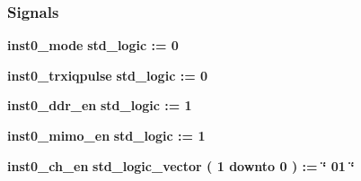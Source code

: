 \subsubsection*{Signals}
 \begin{DoxyCompactItemize}
\item 
{\bf inst0\+\_\+mode} {\bfseries \textcolor{comment}{std\+\_\+logic}\textcolor{vhdlchar}{ }\textcolor{vhdlchar}{ }\textcolor{vhdlchar}{\+:}\textcolor{vhdlchar}{=}\textcolor{vhdlchar}{ }\textcolor{vhdlchar}{ }\textcolor{vhdlchar}{\textquotesingle{}}\textcolor{vhdlchar}{ } \textcolor{vhdldigit}{0} \textcolor{vhdlchar}{ }\textcolor{vhdlchar}{\textquotesingle{}}\textcolor{vhdlchar}{ }} 
\item 
{\bf inst0\+\_\+trxiqpulse} {\bfseries \textcolor{comment}{std\+\_\+logic}\textcolor{vhdlchar}{ }\textcolor{vhdlchar}{ }\textcolor{vhdlchar}{\+:}\textcolor{vhdlchar}{=}\textcolor{vhdlchar}{ }\textcolor{vhdlchar}{ }\textcolor{vhdlchar}{\textquotesingle{}}\textcolor{vhdlchar}{ } \textcolor{vhdldigit}{0} \textcolor{vhdlchar}{ }\textcolor{vhdlchar}{\textquotesingle{}}\textcolor{vhdlchar}{ }} 
\item 
{\bf inst0\+\_\+ddr\+\_\+en} {\bfseries \textcolor{comment}{std\+\_\+logic}\textcolor{vhdlchar}{ }\textcolor{vhdlchar}{ }\textcolor{vhdlchar}{\+:}\textcolor{vhdlchar}{=}\textcolor{vhdlchar}{ }\textcolor{vhdlchar}{ }\textcolor{vhdlchar}{\textquotesingle{}}\textcolor{vhdlchar}{ } \textcolor{vhdldigit}{1} \textcolor{vhdlchar}{ }\textcolor{vhdlchar}{\textquotesingle{}}\textcolor{vhdlchar}{ }} 
\item 
{\bf inst0\+\_\+mimo\+\_\+en} {\bfseries \textcolor{comment}{std\+\_\+logic}\textcolor{vhdlchar}{ }\textcolor{vhdlchar}{ }\textcolor{vhdlchar}{\+:}\textcolor{vhdlchar}{=}\textcolor{vhdlchar}{ }\textcolor{vhdlchar}{ }\textcolor{vhdlchar}{\textquotesingle{}}\textcolor{vhdlchar}{ } \textcolor{vhdldigit}{1} \textcolor{vhdlchar}{ }\textcolor{vhdlchar}{\textquotesingle{}}\textcolor{vhdlchar}{ }} 
\item 
{\bf inst0\+\_\+ch\+\_\+en} {\bfseries \textcolor{comment}{std\+\_\+logic\+\_\+vector}\textcolor{vhdlchar}{ }\textcolor{vhdlchar}{(}\textcolor{vhdlchar}{ }\textcolor{vhdlchar}{ } \textcolor{vhdldigit}{1} \textcolor{vhdlchar}{ }\textcolor{keywordflow}{downto}\textcolor{vhdlchar}{ }\textcolor{vhdlchar}{ } \textcolor{vhdldigit}{0} \textcolor{vhdlchar}{ }\textcolor{vhdlchar}{)}\textcolor{vhdlchar}{ }\textcolor{vhdlchar}{ }\textcolor{vhdlchar}{ }\textcolor{vhdlchar}{\+:}\textcolor{vhdlchar}{=}\textcolor{vhdlchar}{ }\textcolor{vhdlchar}{ }\textcolor{vhdlchar}{ }\textcolor{vhdlchar}{ }\textcolor{keyword}{\char`\"{} 01 \char`\"{}}\textcolor{vhdlchar}{ }} 

\end{DoxyCompactItemize}
